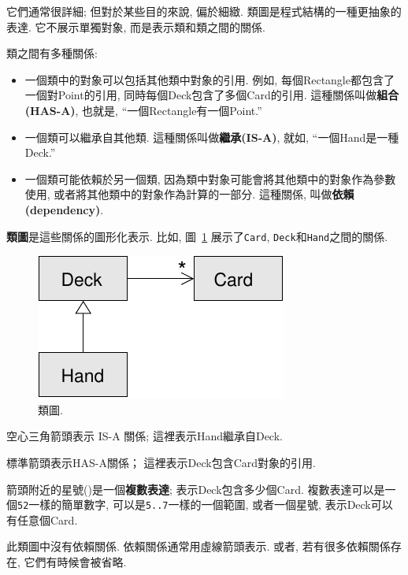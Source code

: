 \documentclass[10pt]{book}
\begin{document}
它們通常很詳細; 但對於某些目的來說, 偏於細緻. 
類圖是程式結構的一種更抽象的表達. 
它不展示單獨對象, 而是表示類和類之間的關係. 

類之間有多種關係:

\begin{itemize}

\item 一個類中的對象可以包括其他類中對象的引用. 
例如, 每個Rectangle都包含了一個對Point的引用,
同時每個Deck包含了多個Card的引用. 
這種關係叫做{\bf 組合(HAS-A)}, 也就是, ``一個Rectangle有一個Point.''

\item 一個類可以繼承自其他類. 
這種關係叫做{\bf 繼承(IS-A)}, 就如, ``一個Hand是一種Deck.''

\item 一個類可能依賴於另一個類, 因為類中對象可能會將其他類中的對象作為參數
使用, 或者將其他類中的對象作為計算的一部分. 
這種關係, 叫做{\bf 依賴(dependency)}.

\end{itemize}

{\bf 類圖}是這些關係的圖形化表示. 比如, 圖~\ref{fig.class1} 
展示了{\tt Card}, {\tt Deck}和{\tt Hand}之間的關係. 

\begin{figure}
\centerline
{\includegraphics[scale=0.8]{figs/class1.pdf}}
\caption{類圖.}
\label{fig.class1}
\end{figure}

空心三角箭頭表示 IS-A 關係;
這裡表示Hand繼承自Deck. 

標準箭頭表示HAS-A關係；
這裡表示Deck包含Card對象的引用. 

箭頭附近的星號({\tt *})是一個{\bf 複數表達};
表示Deck包含多少個Card. 
複數表達可以是一個{\tt 52}一樣的簡單數字, 
可以是{\tt 5..7}一樣的一個範圍, 
或者一個星號, 表示Deck可以有任意個Card. 

此類圖中沒有依賴關係. 
依賴關係通常用虛線箭頭表示. 
或者, 若有很多依賴關係存在, 它們有時候會被省略. 
\end{document}
